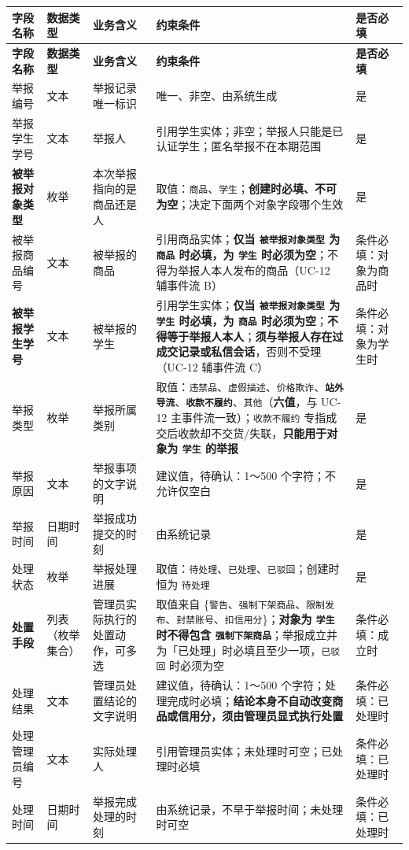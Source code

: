 \documentclass[12pt,a4paper]{ctexart}
\begin{document}
{\scriptsize
\begin{longtable}{|p{1.54cm}|p{1.58cm}|p{2.61cm}|p{8.27cm}|p{1.99cm}|}
\hline
\textbf{字段名称} & \textbf{数据类型} & \textbf{业务含义} & \textbf{约束条件} & \textbf{是否必填} \\
\hline
\endfirsthead
\hline
\textbf{字段名称} & \textbf{数据类型} & \textbf{业务含义} & \textbf{约束条件} & \textbf{是否必填} \\
\hline
\endhead
\hline
\endfoot
举报编号 & 文本 & 举报记录唯一标识 & 唯一、非空、由系统生成 & 是 \\
\hline
举报学生学号 & 文本 & 举报人 & 引用学生实体；非空；举报人只能是已认证学生；匿名举报不在本期范围 & 是 \\
\hline
\textbf{被举报对象类型} & 枚举 & 本次举报指向的是商品还是人 & 取值：\texttt{商品}、\texttt{学生}；\textbf{创建时必填、不可为空}；决定下面两个对象字段哪个生效 & 是 \\
\hline
被举报商品编号 & 文本 & 被举报的商品 & 引用商品实体；\textbf{仅当 \texttt{被举报对象类型} 为 \texttt{商品} 时必填，为 \texttt{学生} 时必须为空}；不得为举报人本人发布的商品（UC-12 辅事件流 B） & 条件必填：对象为商品时 \\
\hline
\textbf{被举报学生学号} & 文本 & 被举报的学生 & 引用学生实体；\textbf{仅当 \texttt{被举报对象类型} 为 \texttt{学生} 时必填，为 \texttt{商品} 时必须为空}；\textbf{不得等于举报人本人}；\textbf{须与举报人存在过成交记录或私信会话}，否则不受理（UC-12 辅事件流 C） & 条件必填：对象为学生时 \\
\hline
举报类型 & 枚举 & 举报所属类别 & 取值：\texttt{违禁品}、\texttt{虚假描述}、\texttt{价格欺诈}、\textbf{\texttt{站外导流}}、\textbf{\texttt{收款不履约}}、\texttt{其他}（\textbf{六值}，与 UC-12 主事件流一致）；\texttt{收款不履约} 专指成交后收款却不交货/失联，\textbf{只能用于对象为 \texttt{学生} 的举报} & 是 \\
\hline
举报原因 & 文本 & 举报事项的文字说明 & 建议值，待确认：1～500 个字符；不允许仅空白 & 是 \\
\hline
举报时间 & 日期时间 & 举报成功提交的时刻 & 由系统记录 & 是 \\
\hline
处理状态 & 枚举 & 举报处理进展 & 取值：\texttt{待处理}、\texttt{已处理}、\texttt{已驳回}；创建时恒为 \texttt{待处理} & 是 \\
\hline
\textbf{处置手段} & 列表（枚举集合） & 管理员实际执行的处置动作，可多选 & 取值来自 \{\texttt{警告}、\texttt{强制下架商品}、\texttt{限制发布}、\texttt{封禁账号}、\texttt{扣信用分}\}；\textbf{对象为 \texttt{学生} 时不得包含 \texttt{强制下架商品}}；举报成立并为「已处理」时必填且至少一项，\texttt{已驳回} 时必须为空 & 条件必填：成立时 \\
\hline
处理结果 & 文本 & 管理员处置结论的文字说明 & 建议值，待确认：1～500 个字符；处理完成时必填；\textbf{结论本身不自动改变商品或信用分，须由管理员显式执行处置} & 条件必填：已处理时 \\
\hline
处理管理员编号 & 文本 & 实际处理人 & 引用管理员实体；未处理时可空；已处理时必填 & 条件必填：已处理时 \\
\hline
处理时间 & 日期时间 & 举报完成处理的时刻 & 由系统记录，不早于举报时间；未处理时可空 & 条件必填：已处理时 \\
\hline
\end{longtable}
}
\end{document}
